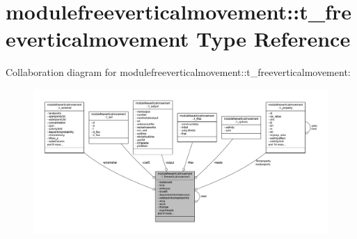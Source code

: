 \hypertarget{structmodulefreeverticalmovement_1_1t__freeverticalmovement}{}\section{modulefreeverticalmovement\+:\+:t\+\_\+freeverticalmovement Type Reference}
\label{structmodulefreeverticalmovement_1_1t__freeverticalmovement}


Collaboration diagram for modulefreeverticalmovement\+:\+:t\+\_\+freeverticalmovement\+:\nopagebreak
\begin{figure}[H]
\begin{center}
\leavevmode
\includegraphics[width=350pt]{structmodulefreeverticalmovement_1_1t__freeverticalmovement__coll__graph}
\end{center}
\end{figure}
